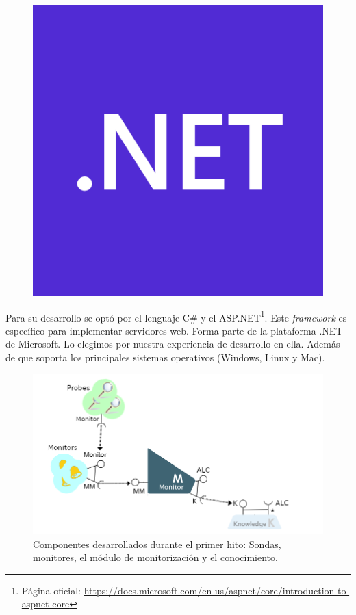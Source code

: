 \begin{figure}
  \vspace{-15pt}
  \includegraphics[scale=0.15]{cap_implementacion/images/dotnet-logo}
  \centering
\end{figure}

Para su desarrollo se optó por el lenguaje C\# y el  ASP.NET\footnote{Página oficial: \url{https://docs.microsoft.com/en-us/aspnet/core/introduction-to-aspnet-core}}. Este \emph{framework} es específico para implementar servidores web. Forma parte de la plataforma .NET de Microsoft. Lo elegimos por nuestra experiencia de desarrollo en ella. Además de que soporta los principales sistemas operativos (Windows, Linux y Mac).

\begin{figure}[h!]
  \centering
  \includegraphics[scale=0.45]{cap_implementacion/images/hito-1-monitorizacion}
  \caption{Componentes desarrollados durante el primer hito: Sondas, monitores, el módulo de monitorización y el conocimiento.}
  \label{fig:hito-1-monitorizacion}
\end{figure}

